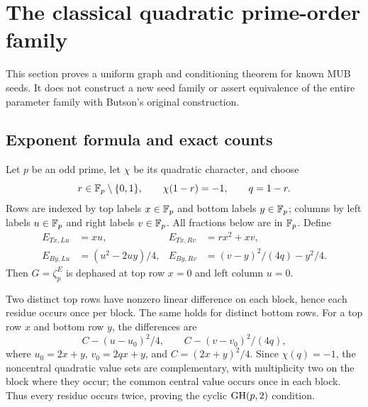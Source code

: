 \section{The classical quadratic prime-order family}\label{sec:quadratic}
This section proves a uniform graph and conditioning theorem for known MUB seeds. It does not construct a new seed family or assert equivalence of the entire parameter family with Butson's original construction.

\subsection{Exponent formula and exact counts}
Let $p$ be an odd prime, let $\chi$ be its quadratic character, and choose
\[
 r\in\mathbb F_p\setminus\{0,1\},\qquad\chi(1-r)=-1,\qquad q=1-r.
\]
Rows are indexed by top labels $x\in\mathbb F_p$ and bottom labels $y\in\mathbb F_p$; columns by left labels $u\in\mathbb F_p$ and right labels $v\in\mathbb F_p$. All fractions below are in $\mathbb F_p$. Define
\begin{equation}\label{eq:quadraticblocks}
 \begin{aligned}
 E_{Tx,Lu}&=xu,&E_{Tx,Rv}&=rx^2+xv,\\
 E_{By,Lu}&=(u^2-2uy)/4,&E_{By,Rv}&=(v-y)^2/(4q)-y^2/4.
 \end{aligned}
\end{equation}
Then $G=\zeta_p^E$ is dephased at top row $x=0$ and left column $u=0$.

Two distinct top rows have nonzero linear difference on each block, hence each residue occurs once per block. The same holds for distinct bottom rows. For a top row $x$ and bottom row $y$, the differences are
\[
 C-(u-u_0)^2/4,\qquad C-(v-v_0)^2/(4q),
\]
where $u_0=2x+y$, $v_0=2qx+y$, and $C=(2x+y)^2/4$. Since $\chi(q)=-1$, the noncentral quadratic value sets are complementary, with multiplicity two on the block where they occur; the common central value occurs once in each block. Thus every residue occurs twice, proving the cyclic $\operatorname{GH}(p,2)$ condition.

